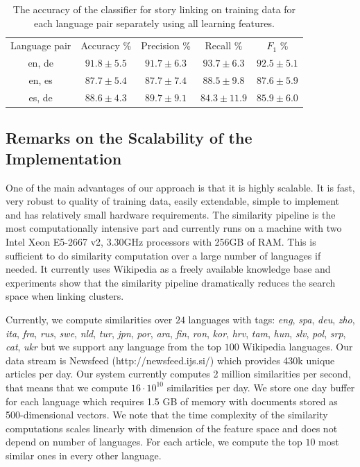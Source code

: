 \documentclass[twoside,11pt]{article}
\begin{document}
\begin{table}[h]
\caption{The accuracy of the classifier for story linking on training data for each language pair separately using all learning features.}
\label{table:langPairEval}
\begin{center}
\begin{tabular}{|c|c|c|c|c|}
  \hline
  \cline{1-5}
  Language pair & Accuracy \% & Precision \% & Recall \% & $F_1$ \% \\ \cline{1-5}
  en, de & $91.8 \pm 5.5$ & $91.7 \pm  6.3$ & $93.7 \pm  6.3$ & $92.5 \pm  5.1$ \\ \cline{1-5}
  en, es & $87.7 \pm 5.4$ & $87.7 \pm  7.4$ & $88.5 \pm  9.8$ & $87.6 \pm  5.9$ \\ \cline{1-5}
  es, de & $88.6 \pm 4.3$ & $89.7 \pm  9.1$ & $84.3 \pm 11.9$ & $85.9 \pm  6.0$ \\ \cline{1-5}
  \hline
\end{tabular}
\end{center}
\end{table}

\subsection{Remarks on the Scalability of the Implementation}

One of the main advantages of our approach is that it is highly scalable. It is fast, very robust to quality of training data, easily extendable, simple to implement and has relatively small hardware requirements. The similarity pipeline is the most computationally intensive part and currently runs on a machine with two Intel Xeon E5-2667 v2, 3.30GHz processors with 256GB of RAM. This is sufficient to do similarity computation over a large number of languages if needed. It currently uses Wikipedia as a freely available knowledge base and experiments show that the similarity pipeline dramatically reduces the search space when linking clusters.

Currently, we compute similarities over $24$ languages with tags: \emph{eng}, \emph{spa}, \emph{deu}, \emph{zho}, \emph{ita}, \emph{fra}, \emph{rus}, \emph{swe}, \emph{nld}, \emph{tur}, \emph{jpn}, \emph{por}, \emph{ara}, \emph{fin}, \emph{ron}, \emph{kor}, \emph{hrv}, \emph{tam}, \emph{hun}, \emph{slv}, \emph{pol}, \emph{srp}, \emph{cat}, \emph{ukr} but we support any language from the top $100$ Wikipedia languages. Our data stream is Newsfeed (http://newsfeed.ijs.si/) which provides 430k unique articles per day. Our system currently computes 2 million similarities per second, that means that we compute $16 \cdot 10^{10}$ similarities per day. We
store one day buffer for each language which requires 1.5 GB of memory with documents   stored as 500-dimensional vectors. We  note that the time complexity of the similarity computations scales linearly with dimension of the feature space and does not  depend on number of languages. For each article, we compute the top $10$  most similar ones in every other language.
\end{document}
